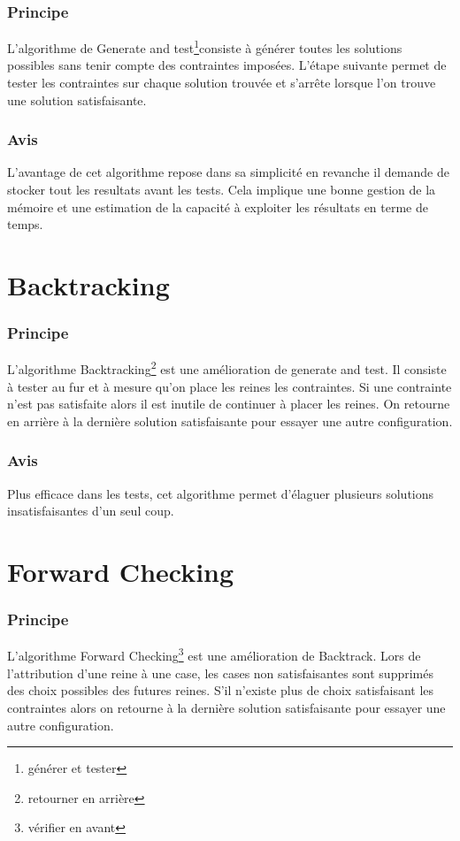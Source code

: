 \documentclass[a4paper,12pt]{report}
\begin{document}
	\subsubsection{Principe}
	L'algorithme de Generate and test\footnote{générer et tester}consiste à générer toutes les solutions possibles sans tenir compte des contraintes imposées. L'étape suivante permet de tester les contraintes sur chaque solution trouvée et s'arrête lorsque l'on trouve une solution satisfaisante. 
	\subsubsection{Avis}
	L'avantage de cet algorithme repose dans sa simplicité en revanche il demande de stocker tout les resultats avant les tests. Cela implique une bonne gestion de la mémoire et une estimation de la capacité à exploiter les résultats en terme de temps.

	\section{Backtracking}
	\subsubsection{Principe}
	L'algorithme Backtracking\footnote{retourner en arrière} est une amélioration de generate and test. Il consiste à tester au fur et à mesure qu'on place les reines les contraintes. Si une contrainte n'est pas satisfaite alors il est inutile de continuer à placer les reines. On retourne en arrière à la dernière solution satisfaisante pour essayer une autre configuration.
	\subsubsection{Avis}
	Plus efficace dans les tests, cet algorithme permet d'élaguer plusieurs solutions insatisfaisantes d'un seul coup.
	\section{Forward Checking}
	\subsubsection{Principe}
	L'algorithme Forward Checking\footnote{vérifier en avant} est une amélioration de Backtrack. Lors de l'attribution d'une reine à une case, les cases non satisfaisantes sont supprimés des choix possibles des futures reines. S'il n'existe plus de choix satisfaisant les contraintes alors on retourne à la dernière solution satisfaisante pour essayer une autre configuration.
\end{document}

